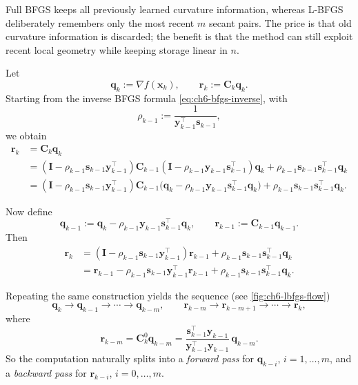 Full BFGS keeps all previously learned curvature information, whereas
L-BFGS deliberately remembers only the most recent $m$ secant pairs. The price
is that old curvature information is discarded; the benefit is that the method
can still exploit recent local geometry while keeping storage linear in $n$.

Let
\[
  \mathbf{q}_k:=\nabla f(\mathbf{x}_k),
  \qquad
  \mathbf{r}_k:=\mathbf{C}_k\mathbf{q}_k.
\]
Starting from the inverse BFGS formula \eqref{eq:ch6-bfgs-inverse}, with
\[
  \rho_{k-1}:=\frac{1}{\mathbf{y}_{k-1}^\top \mathbf{s}_{k-1}},
\]
we obtain
\begin{align*}
  \mathbf{r}_k
  &=\mathbf{C}_k\mathbf{q}_k \\
  &=
  (\mathbf{I}-\rho_{k-1}\mathbf{s}_{k-1}\mathbf{y}_{k-1}^\top)
  \mathbf{C}_{k-1}
  (\mathbf{I}-\rho_{k-1}\mathbf{y}_{k-1}\mathbf{s}_{k-1}^\top)
  \mathbf{q}_k
  +\rho_{k-1}\mathbf{s}_{k-1}\mathbf{s}_{k-1}^\top \mathbf{q}_k \\
  &=
  (\mathbf{I}-\rho_{k-1}\mathbf{s}_{k-1}\mathbf{y}_{k-1}^\top)
  \mathbf{C}_{k-1}
  \bigl(
    \mathbf{q}_k-\rho_{k-1}\mathbf{y}_{k-1}\mathbf{s}_{k-1}^\top \mathbf{q}_k
  \bigr)
  +\rho_{k-1}\mathbf{s}_{k-1}\mathbf{s}_{k-1}^\top \mathbf{q}_k.
\end{align*}

\noindent Now define
\[
  \mathbf{q}_{k-1}
  :=
  \mathbf{q}_k-\rho_{k-1}\mathbf{y}_{k-1}\mathbf{s}_{k-1}^\top \mathbf{q}_k,
  \qquad
  \mathbf{r}_{k-1}:=\mathbf{C}_{k-1}\mathbf{q}_{k-1}.
\]
Then
\begin{align*}
  \mathbf{r}_k
  &=
  (\mathbf{I}-\rho_{k-1}\mathbf{s}_{k-1}\mathbf{y}_{k-1}^\top)\mathbf{r}_{k-1}
  +\rho_{k-1}\mathbf{s}_{k-1}\mathbf{s}_{k-1}^\top \mathbf{q}_k \\
  &=
  \mathbf{r}_{k-1}
  -\rho_{k-1}\mathbf{s}_{k-1}\mathbf{y}_{k-1}^\top \mathbf{r}_{k-1}
  +\rho_{k-1}\mathbf{s}_{k-1}\mathbf{s}_{k-1}^\top \mathbf{q}_k.
\end{align*}

\noindent Repeating the same construction yields the sequence (see \cref{fig:ch6-lbfgs-flow})
\[
  \mathbf{q}_k\to \mathbf{q}_{k-1}\to \cdots \to \mathbf{q}_{k-m},
  \qquad
  \mathbf{r}_{k-m}\to \mathbf{r}_{k-m+1}\to \cdots \to \mathbf{r}_k,
\]
where
\[
  \mathbf{r}_{k-m}
  =
  \mathbf{C}_k^0 \mathbf{q}_{k-m}
  =
  \frac{\mathbf{s}_{k-1}^\top \mathbf{y}_{k-1}}
  {\mathbf{y}_{k-1}^\top \mathbf{y}_{k-1}}\,
  \mathbf{q}_{k-m}.
\]
So the computation naturally splits into a \emph{forward pass} for
$\mathbf{q}_{k-i}$, $i=1,\dots,m$, and a \emph{backward pass} for
$\mathbf{r}_{k-i}$, $i=0,\dots,m$.

